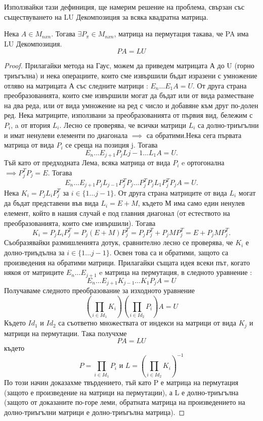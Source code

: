 \documentclass{article}
\begin{document}
Използвайки тази дефиниция, ще намерим решение на проблема, свързан със съществуването на LU Декомпозиция за всяка квадратна матрица.
\begin{theorem}
Нека $A\in M_{nxn}$. Тогава $\exists P_{\pi} \in M_{nxn}$, матрица на пермутация такава, че PA има LU Декомпозиция. \[PA = LU\]
\end{theorem}
\begin{proof}
Прилагайки метода на Гаус, можем да приведем матрицата А до U (горно триъгълна) и нека операциите, които сме извършили бъдат изразени с умножение отляво на матрицата А със следните матрици : $E_{n}\dots E_{1}A = U$. От друга страна преобразованията, които сме извършили могат да бъдат или от вида разместване на два реда, или от вида умножение на ред с число и добавяне към друг по-долен ред. Нека матриците, използвани за преобразованията от първия вид, бележим с $P_{i}$, a от втория $L_{i}$. Лесно се проверява, че всички матрици $L_{i}$ са долно-триъгълни и имат ненулеви елементи по диагонала $\implies$ са обратими.Нека сега първата матрица от вида $P_{i}$ се среща на позиция j. Тогава \[E_{n}\dots E_{j+1}P_{j}L{j-1}\dots L_{1}A = U .\] Тъй като от предходната Лема, всяка матрица от вида $P_{i}$ e ортогонална $\implies P_{j}^{T}P_{j} = E$. Тогава \[E_{n}\dots E_{j+1}P_{j}L_{j-1}P_{j}^{T}P_{j}\dots P_{j}^{T}P_{j}L_{1}P_{j}^{T}P_{j}A = U .\] Нека $K_{i} = P_{j}L_{i}P_{j}^{T}$ за $i \in \{1\dots j-1\}$. От друга страна матриците от вида $L_{i}$ могат да бъдат представени във вида $L_{i} = E + M$, където М има само един ненулев елемент, който в нашия случай е под главния диагонал (от естеството на преобразованията, които сме извършили). Тогава \[K_{i} = P_{j}L_{i}P_{j}^{T} = P_{j}(E + M)P_{j}^{T} = P_{j}P_{j}^{T} + P_{j}MP_{j}^{T} = E + P_{j}MP_{j}^{T} .\] Съобразявайки размишленията дотук, сравнително лесно се проверява, че $K_{i}$ е долно-триъдълна за $i \in \{1\dots j-1\}$. Освен това са и обратими, защото са произведения на обратими матрици. Прилагайки същата идея всеки път, когато някоя от матриците $E_{n}\dots E_{j+1}$ e матрица на пермутация, в следното уравнение : \[E_{n}\dots E_{j+1}K_{j-1}\dots K_{1}P_{j}A = U\] 
Получаваме следното преобразование за изходното уравнение
\begin{equation*}
  (\prod_{i \in Id_{1}} K_{i}) (\prod_{i \in Id_{2}} P_{i}) A = U 
\end{equation*}
Където $Id_{1}$ и $Id_{2}$ са съответно множествата от индекси на матрици от вида $K_{j}$ и матрици на пермутации. Така получхме \[PA = LU\] където \[P = \prod_{i \in Id_{1}} P_{i} \text{ и } L = (\prod_{i \in Id_{2}} K_{i})^{-1}\] По този начин доказахме твърдението, тъй като P е матрица на пермутация (защото е произведение на матрици на пермутации), а L е долно-триъгълна (защото от доказаните по-горе леми, обратната матрица на произведението на долно-триъгълни матрици е долно-триъгълна матрица).
\end{proof}
\end{document}

